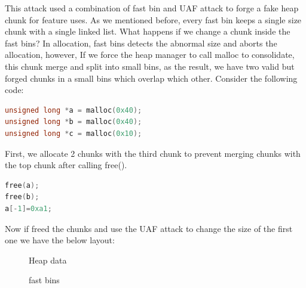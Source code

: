 \documentclass{masterthesis}
\newcommand*\fb{fast bins}
\newcommand*\sbs{small bins}
\begin{document}
This attack used a combination of fast bin and UAF attack to forge a fake heap chunk for feature uses. As we mentioned before, every fast bin keeps a single size chunk with a single linked list. What happens if we change a chunk inside the \fb{}? In allocation, \fb{} detects the abnormal size and aborts the allocation, however, If we force the heap manager to call malloc to consolidate, this chunk merge and split into \sbs{}, as the result, we have two valid but forged chunks in a \sbs{} which overlap which other. Consider the following code: 

\begin{lstlisting}[language=c,frame=tlrb]
unsigned long *a = malloc(0x40);
unsigned long *b = malloc(0x40);
unsigned long *c = malloc(0x10);
\end{lstlisting}

First, we allocate 2 chunks with the third chunk to prevent merging chunks with the top chunk after calling free(). 

\begin{lstlisting}[language=c,frame=tlrb]
free(a);
free(b);
a[-1]=0xa1;
\end{lstlisting}

Now if freed the chunks and use the UAF attack to change the size of the first one we have the below layout:

\begin{figure}[h!]
  \caption{Heap data}
\end{figure}

\begin{figure}[h!]
  \caption{\fb{}}
\end{figure}
\end{document}
